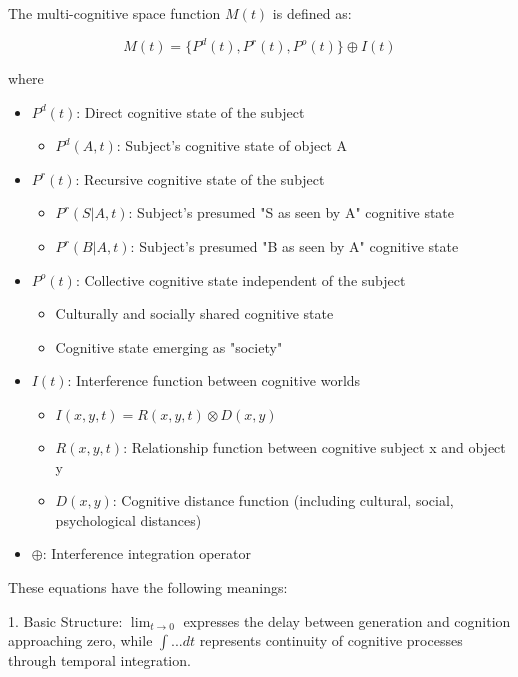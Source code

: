 \documentclass{article}
\begin{document}
The multi-cognitive space function $M(t)$ is defined as:

$$
M(t) = \{P^d(t), P^r(t), P^o(t)\} \oplus I(t)
$$

where
\begin{itemize}
    \item $P^d(t)$: Direct cognitive state of the subject
        \begin{itemize}
            \item $P^d(A, t)$: Subject's cognitive state of object A
        \end{itemize}
    \item $P^r(t)$: Recursive cognitive state of the subject
        \begin{itemize}
            \item $P^r(S|A, t)$: Subject's presumed "S as seen by A" cognitive state
            \item $P^r(B|A, t)$: Subject's presumed "B as seen by A" cognitive state
        \end{itemize}
    \item $P^o(t)$: Collective cognitive state independent of the subject
        \begin{itemize}
            \item Culturally and socially shared cognitive state
            \item Cognitive state emerging as "society"
        \end{itemize}
    \item $I(t)$: Interference function between cognitive worlds
        \begin{itemize}
            \item $I(x, y, t) = R(x, y, t) \otimes D(x, y)$
            \item $R(x, y, t)$: Relationship function between cognitive subject x and object y
            \item $D(x, y)$: Cognitive distance function (including cultural, social, psychological distances)
        \end{itemize}
    \item $\oplus$: Interference integration operator
\end{itemize}

These equations have the following meanings:

1. Basic Structure: $\lim_{t\to0}$ expresses the delay between generation and cognition approaching zero, while $\int...dt$ represents continuity of cognitive processes through temporal integration.
\end{document}
